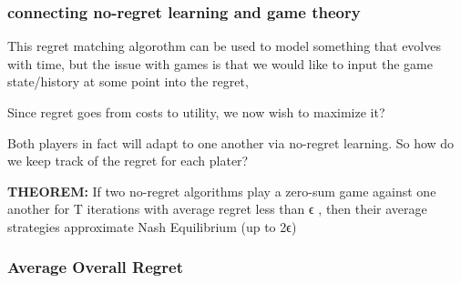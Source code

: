 \documentclass{article}
\begin{document}
\subsubsection{connecting no-regret learning and game theory}
This regret matching algorothm can be used to model something that evolves with time, but the issue with games is that we would like to input the game state/history at some point into the regret,

Since regret goes from costs to utility, we now wish to maximize it?

Both players in fact will adapt to one another via no-regret learning. So how do we keep track of the regret for each plater?

\textbf{THEOREM:}
If two no-regret algorithms play a zero-sum game against one another for T
 iterations with average regret less than ϵ
, then their average strategies approximate Nash Equilibrium (up to 2ϵ) 

\subsubsection{Average Overall Regret}
\end{document}
